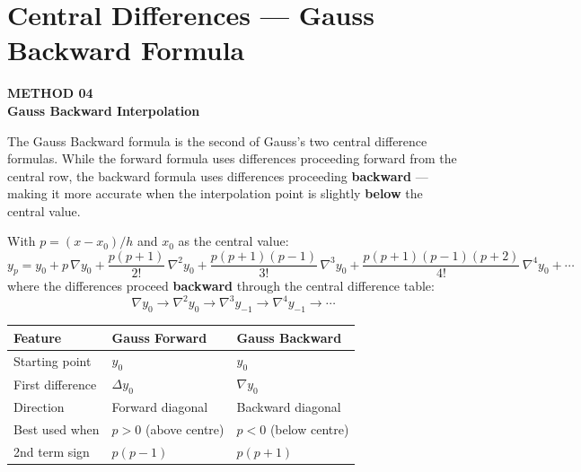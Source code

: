 \documentclass[12pt]{article}
\newcommand{\hcell}[1]{\textbf{\color{white}#1}}
\begin{document}
\newpage

\section{Central Differences — Gauss Backward Formula}

\begin{tcolorbox}[
  enhanced, arc=0pt, boxrule=0pt,
  colback=primary, colframe=primary,
  left=16pt, right=16pt, top=14pt, bottom=10pt,
  borderline south={4pt}{0pt}{accent},
]
  {\color{accent!70}\small\bfseries METHOD 04}\\[4pt]
  {\LARGE\bfseries\color{white} Gauss Backward Interpolation}
\end{tcolorbox}

\vspace{10pt}

\begin{histbox}
The Gauss Backward formula is the second of Gauss's two central difference formulas. While the forward formula uses differences proceeding forward from the central row, the backward formula uses differences proceeding \textbf{backward} — making it more accurate when the interpolation point is slightly \textbf{below} the central value.
\end{histbox}

\bigskip

\begin{defbox}
With $p = (x - x_0)/h$ and $x_0$ as the central value:
\[
  \boxed{y_p = y_0 + p\,\nabla y_0 + \frac{p(p+1)}{2!}\,\nabla^2 y_0 + \frac{p(p+1)(p-1)}{3!}\,\nabla^3 y_0 + \frac{p(p+1)(p-1)(p+2)}{4!}\,\nabla^4 y_0 + \cdots}
\]
where the differences proceed \textbf{backward} through the central difference table:
\[
  \nabla y_0 \to \nabla^2 y_0 \to \nabla^3 y_{-1} \to \nabla^4 y_{-1} \to \cdots
\]
\end{defbox}

\bigskip

\begin{derivbox}
\begin{center}{\small
\begin{tabular}{p{4cm} p{5cm} p{5cm}}
\toprule
\rowcolor{primary}
\hcell{Feature} & \hcell{Gauss Forward} & \hcell{Gauss Backward} \\
\midrule
\rowcolor{amberbg}
Starting point & $y_0$ & $y_0$ \\
First difference & $\Delta y_0$ & $\nabla y_0$ \\
\rowcolor{amberbg}
Direction & Forward diagonal & Backward diagonal \\
Best used when & $p > 0$ (above centre) & $p < 0$ (below centre) \\
\rowcolor{amberbg}
2nd term sign & $p(p-1)$ & $p(p+1)$ \\
\bottomrule
\end{tabular}
}\end{center}
\end{derivbox}
\end{document}
